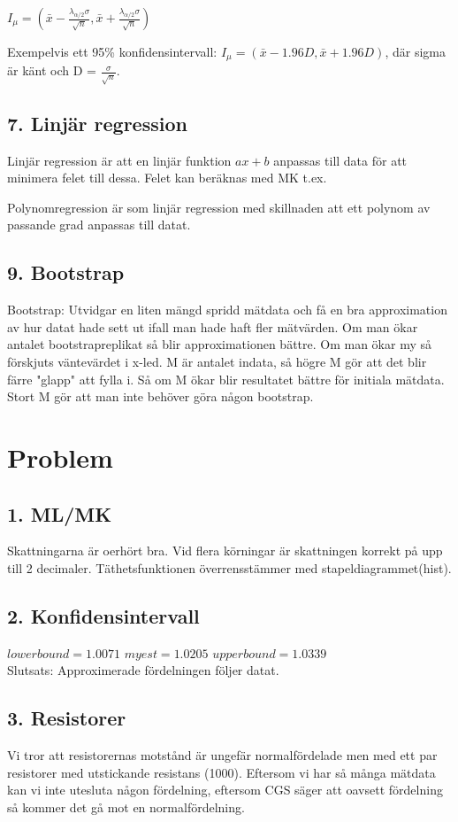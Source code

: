 \documentclass{article}
\begin{document}
$I_{{\mu }}=({\bar  {x}}-{\frac  {\lambda _{{\alpha /2}}\sigma }{{\sqrt
{n}}}},{\bar  {x}}+{\frac  {\lambda _{{\alpha /2}}\sigma }{{\sqrt  {n}}}})$

Exempelvis ett 95\% konfidensintervall: $I_{{\mu }}=({\bar
{x}}-1.96D,{\bar  {x}}+1.96D)$, där sigma är känt och D =
$\frac{\sigma}{\sqrt{n}}$.

\subsection*{7. Linjär regression}
Linjär regression är att en linjär funktion $ax+b$ anpassas till data för att
minimera felet till dessa. Felet kan beräknas med MK t.ex.

Polynomregression är som linjär regression med skillnaden att ett polynom av
passande grad anpassas till datat.


\subsection*{9. Bootstrap}
Bootstrap: Utvidgar en liten mängd spridd mätdata och få en bra approximation av
hur datat hade sett ut ifall man hade haft fler mätvärden. Om man ökar antalet
bootstrapreplikat så blir approximationen bättre.
Om man ökar my så förskjuts väntevärdet i x-led.
M är antalet indata, så högre M gör att det blir färre "glapp" att fylla i. Så
om M ökar blir resultatet bättre för initiala mätdata. Stort M gör att man inte
behöver göra någon bootstrap.

\section{Problem}
\subsection*{1. ML/MK}
Skattningarna är oerhört bra. Vid flera körningar är skattningen korrekt på upp
till 2 decimaler. Täthetsfunktionen överrensstämmer med stapeldiagrammet(hist).

\subsection*{2. Konfidensintervall}
$lower bound = 1.0071$
$my est = 1.0205$
$upper bound = 1.0339$\\
Slutsats: Approximerade fördelningen följer datat.


\subsection*{3. Resistorer}
Vi tror att resistorernas motstånd är ungefär normalfördelade men med ett par
resistorer med utstickande resistans (1000). Eftersom vi har så många mätdata
kan vi inte utesluta någon fördelning, eftersom CGS säger att oavsett fördelning
så kommer det gå mot en normalfördelning.
\end{document}
